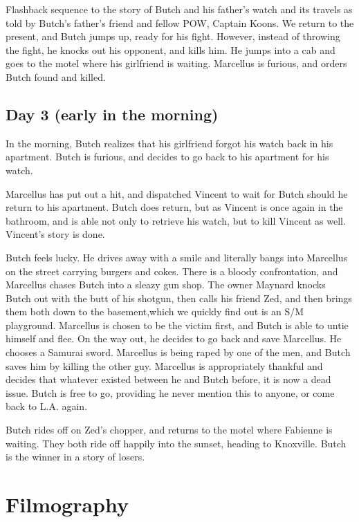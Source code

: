 \documentclass[a4paper,12pt]{article}
\begin{document}
Flashback sequence to the story of Butch and his father's watch and its travels
as told by Butch's father's friend and fellow POW, Captain Koons. We return to
the present, and Butch jumps up, ready for his fight. However, instead of throwing
the fight, he knocks out his opponent, and kills him. He jumps into a cab and goes
to the motel where his girlfriend is waiting. Marcellus is furious, and orders
Butch found and killed.

\subsection*{Day 3 (early in the morning)}

In the morning, Butch realizes that his girlfriend forgot his watch back in his
apartment. Butch is furious, and decides to go back to his apartment for his watch.

Marcellus has put out a hit, and dispatched Vincent to wait for Butch should he
return to his apartment. Butch does return, but as Vincent is once again in the
bathroom, and is able not only to retrieve his watch, but to kill Vincent as well.
Vincent's story is done.

Butch feels lucky. He drives away with a smile and literally bangs into Marcellus
on the street carrying burgers and cokes. There is a bloody confrontation, and
Marcellus chases Butch into a sleazy gun shop. The owner Maynard knocks Butch out
with the butt of his shotgun, then calls his friend Zed, and then brings them both
down to the basement,which we quickly find out is an S/M playground. Marcellus is
chosen to be the victim first, and Butch is able to untie himself and flee. On the
way out, he decides to go back and save Marcellus. He chooses a Samurai sword.
Marcellus is being raped by one of the men, and Butch saves him by killing the
other guy. Marcellus is appropriately thankful and decides that whatever existed
between he and Butch before, it is now a dead issue. Butch is free to go, providing
he never mention this to anyone, or come back to L.A. again.

Butch rides off on Zed's chopper, and returns to the motel where Fabienne is waiting.
They both ride off happily into the sunset, heading to Knoxville. Butch is the
winner in a story of losers.

\section{Filmography}
\end{document}
